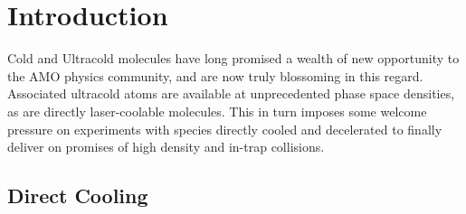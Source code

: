
\chapter{Introduction}
\label{iii}

Cold and Ultracold molecules have long promised a wealth of new opportunity to the AMO physics community, and are now truly blossoming in this regard. Associated ultracold atoms are available at unprecedented phase space densities, as are directly laser-coolable molecules. This in turn imposes some welcome pressure on experiments with species directly cooled and decelerated to finally deliver on promises of high density and in-trap collisions.
%
%
%
%


\section{Direct Cooling}

